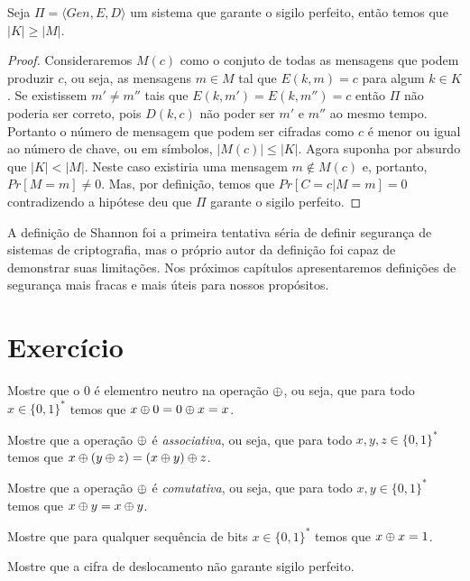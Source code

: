 \begin{theorem}[Shannon]
Seja $\Pi = \langle Gen, E, D \rangle$ um sistema que garante o sigilo perfeito, então temos que $|K| \geq |M|$.  
\end{theorem}
\begin{proof}
  Consideraremos $M(c)$ como o conjuto de todas as mensagens que podem produzir $c$, ou seja, as mensagens $m \in M$ tal que $E(k, m) = c$ para algum $k \in K$.
  Se existissem $m' \neq m''$ tais que $E(k, m') = E(k, m'') = c$ então $\Pi$ não poderia ser correto, pois $D(k, c)$ não poder ser $m'$ e $m''$ ao mesmo tempo. 
  Portanto o número de mensagem que podem ser cifradas como $c$ é menor ou igual ao número de chave, ou em símbolos, $|M(c)| \leq |K|$.
  Agora suponha por absurdo que $|K| < |M|$.
  Neste caso existiria uma mensagem $m \notin M(c)$ e, portanto, $Pr[M = m] \neq 0$.
  Mas, por definição, temos que $Pr[C = c | M = m] = 0$ contradizendo a hipótese deu que $\Pi$ garante o sigilo perfeito. 
\end{proof}

A definição de Shannon foi a primeira tentativa séria de definir segurança de sistemas de criptografia, mas o próprio autor da definição foi capaz de demonstrar suas limitações.
Nos próximos capítulos apresentaremos definições de segurança mais fracas e mais úteis para nossos propósitos.

\section{Exercício}
\label{sec:exercicio}

\begin{exercicio}
  Mostre que o $0$ é elementro neutro na operação $\oplus$, ou seja, que para todo $x \in \{0,1\}^*$ temos que $x \oplus 0 = 0 \oplus x = x$.
\end{exercicio}

\begin{exercicio}
  Mostre que a operação $\oplus$ é {\em associativa}, ou seja, que para todo $x,y,z \in \{0,1\}^*$ temos que $x \oplus (y \oplus z) = (x \oplus y) \oplus z$.
\end{exercicio}

\begin{exercicio}
  Mostre que a operação $\oplus$ é {\em comutativa}, ou seja, que para todo $x,y \in \{0,1\}^*$ temos que $x \oplus y = x \oplus y$.
\end{exercicio}

\begin{exercicio}
  Mostre que para qualquer sequência de bits $x \in \{0,1\}^*$ temos que $x \oplus x = 1$.
\end{exercicio}

\begin{exercicio}
  Mostre que a cifra de deslocamento não garante sigilo perfeito.
\end{exercicio}

